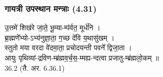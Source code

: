 \subsubsection{गायत्री उपस्थान मन्त्राः (4.31)}
उ॒त्तमे॑ शिख॑रे जा॒ते॒ भू॒म्या-म्प॑र्वत॒ मूर्ध॑नि ।\\
ब्रा॒ह्मणे᳚भ्यो-ऽभ्य॑नुज्ञा॒ता॒ ग॒च्छ दे॑वि य॒थासु॑खम् ।\\
स्तुतो मया वरदा वे॑दमा॒ता॒ प्रचोदयन्ती पवने᳚ द्विजा॒ता ।\\
आयुः पृथिव्यां-द्रविण-म्ब्र॑ह्मव॒र्च॒स॒-म्मह्य-न्दत्वा प्रजातु-म्ब्र॑ह्मलो॒कम् ॥ \\
36.2 (तै. अर. 6.36.1)\\